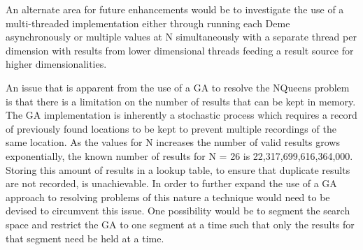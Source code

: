 \documentclass[conference]{IEEEtran}
\begin{document}
An alternate area for future enhancements would be to investigate the use of a multi-threaded implementation either through running each Deme asynchronously or multiple values at N simultaneously with a separate thread per dimension with results from lower dimensional threads feeding a result source for higher dimensionalities.

An issue that is apparent from the use of a GA to resolve the NQueens problem is that there is a limitation on the number of results that can be kept in memory. The GA implementation is inherently a stochastic process which requires a record of previously found locations to be kept to prevent multiple recordings of the same location. As the values for N increases the number of valid results grows exponentially, the known number of results for N = 26 is 22,317,699,616,364,000. Storing this amount of results in a lookup table, to ensure that duplicate results are not recorded, is unachievable. In order to further expand the use of a GA approach to resolving problems of this nature a technique would need to be devised to circumvent this issue. One possibility would be to segment the search space and restrict the GA to one segment at a time such that only the results for that segment need be held at a time.
\end{document}
